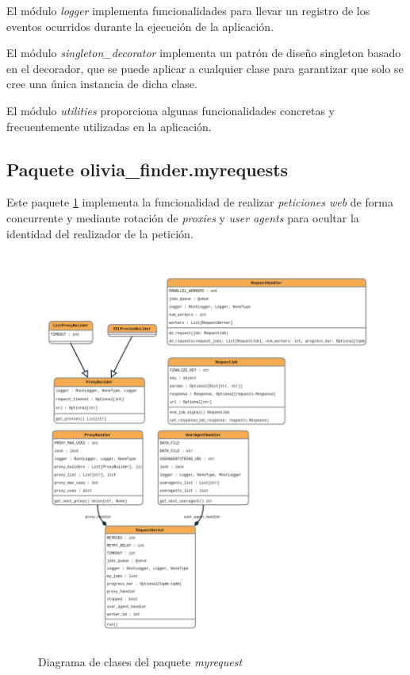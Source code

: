 El módulo \textit{logger} implementa funcionalidades para llevar un registro de los
eventos ocurridos durante la ejecución de la aplicación.

El módulo \textit{singleton\_decorator} implementa un patrón de diseño singleton basado
en el decorador, que se puede aplicar a cualquier clase para garantizar que solo se cree una
única instancia de dicha clase.

El módulo \textit{utilities} proporciona algunas funcionalidades concretas y frecuentemente
utilizadas en la aplicación.

\subsection{Paquete olivia\_finder.myrequests}

Este paquete \ref{fig:myrequest_classes} implementa la funcionalidad de realizar \textit{peticiones web} de forma concurrente
y mediante rotación de \textit{proxies} y \textit{user agents} para ocultar la identidad del realizador
de la petición.

\begin{figure}[ht!]
    \centering
    \includegraphics[width=1\textwidth]{img/anexos/myrequests_classes.png}
    \caption{Diagrama de clases del paquete \textit{myrequest}}
    \label{fig:myrequest_classes}
\end{figure}



